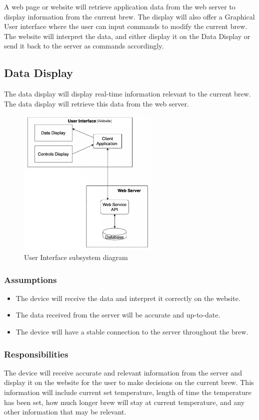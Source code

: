 A web page or website will retrieve application data from the web server to display information from the current brew. The display will also offer a Graphical User interface where the user can input commands to modify the current brew. The website will interpret the data, and either display it on the Data Display or send it back to the server as commands accordingly.

\subsection{Data Display}
The data display will display real-time information relevant to the current brew. The data display will retrieve this data from the web server.

\begin{figure}[h!]
	\centering
 	\includegraphics[width=0.60\textwidth]{images/UI_subsystem}
 \caption{User Interface subsystem diagram}
\end{figure}

\subsubsection{Assumptions}
\begin {itemize}
\item The device will receive the data and interpret it correctly on the website.
\item The data received from the server will be accurate and up-to-date.
\item The device will have a stable connection to the server throughout the brew.
\end {itemize}


\subsubsection{Responsibilities}
The device will receive accurate and relevant information from the server and display it on the website for the user to make decisions on the current brew. This information will include current set temperature, length of time the temperature has been set, how much longer brew will stay at current temperature, and any other information that may be relevant.

